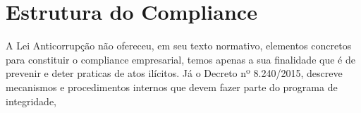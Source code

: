\chapter{Estrutura do Compliance}

A Lei Anticorrupção não ofereceu, em seu texto normativo, elementos concretos para constituir o compliance empresarial, temos apenas a sua finalidade que é de prevenir e deter praticas de atos ilícitos. Já o Decreto nº 8.240/2015, descreve mecanismos e procedimentos internos que devem fazer parte do programa de integridade, 